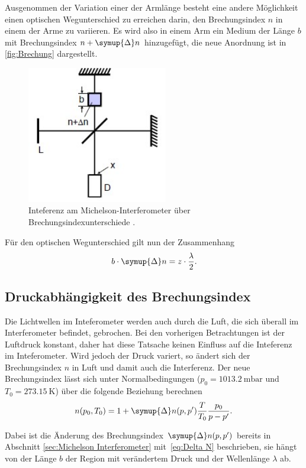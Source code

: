 Ausgenommen der Variation einer der Armlänge besteht eine andere Möglichkeit einen optischen Wegunterschied zu erreichen darin,
den Brechungsindex $n$ in einem der Arme zu variieren.
Es wird also in einem Arm ein Medium der Länge $b$ mit Brechungsindex $n+\symup{\Delta}n$ hinzugefügt, die
neue Anordnung ist in \autoref{fig:Brechung} dargestellt.
\begin{figure}[H]
    \centering
    \includegraphics[height=6cm]{content/pics/Brechung.jpg}
    \caption{Inteferenz am Michelson-Interferometer über Brechungsindexunterschiede \cite{v401}.}
    \label{fig:Brechung}
\end{figure}
Für den optischen Wegunterschied gilt nun der Zusammenhang
\begin{equation}
    \label{eq:Delta N}
    b \cdot \symup{\Delta}n=z \cdot \frac{\lambda}{2}.
\end{equation}

\subsection{Druckabhängigkeit des Brechungsindex}

Die Lichtwellen im Inteferometer werden auch durch die Luft, die sich überall im Interferometer befindet,
gebrochen. Bei den vorherigen Betrachtungen ist der Luftdruck konstant, daher hat diese Tatsache
keinen Einfluss auf die Inteferenz im Inteferometer.
Wird jedoch der Druck variert, so ändert sich der Brechungsindex $n$ in Luft und damit auch die Interferenz.
Der neue Brechungsindex lässt sich unter Normalbedingungen ($p_0=\qty{1013.2}{\milli\bar}$ und $T_0=\qty{273.15}{\kelvin}$)
über die folgende Beziehung berechnen
\begin{equation}
    \label{eq:Brechung}
    n(p_0, T_0) = 1 + \symup{\Delta} n(p,p')\frac{T}{T_0}\frac{p_0}{p - p'}.
\end{equation}

Dabei ist die Änderung des Brechungsindex $\symup{\Delta} n(p,p')$ bereits in Abschnitt \ref{sec:Michelson Interferometer} 
mit~\eqref{eq:Delta N} beschrieben, sie hängt von der Länge $b$ der Region mit verändertem Druck und der
Wellenlänge $\lambda$ ab.